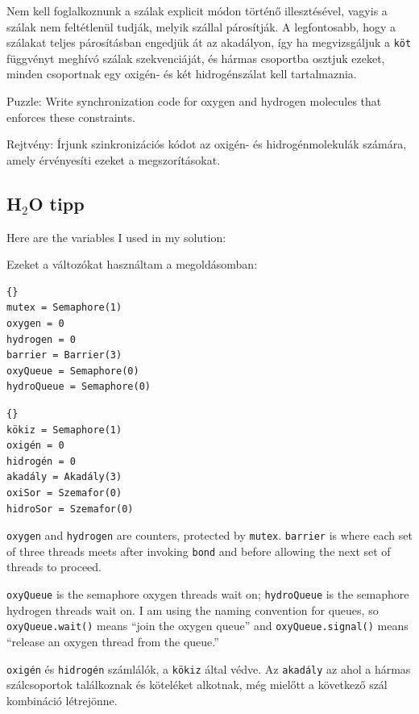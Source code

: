 \documentclass{book}
\newcommand{\clearemptydoublepage}{\newpage\cleardoublepage}
\begin{document}
Nem kell foglalkoznunk a szálak explicit módon történő illesztésével,
vagyis a szálak nem feltétlenül tudják, melyik szállal párosítják.
A legfontosabb, hogy a szálakat teljes párosításban engedjük át
az akadályon, így ha megvizsgáljuk a {\tt köt} függvényt meghívó szálak szekvenciáját,
és hármas csoportba osztjuk ezeket, minden csoportnak
egy oxigén- és két hidrogénszálat kell tartalmaznia. 

Puzzle: Write synchronization code for oxygen and hydrogen
molecules that enforces these constraints.

Rejtvény: Írjunk szinkronizációs kódot az oxigén- és hidrogénmolekulák
számára, amely érvényesíti ezeket a megszorításokat.

\clearemptydoublepage
\subsection{H$_2$O tipp}

Here are the variables I used in my solution:

Ezeket a változókat használtam a megoldásomban:

\begin{lstlisting}[title={Water building hint}]{}
mutex = Semaphore(1)
oxygen = 0
hydrogen = 0
barrier = Barrier(3)
oxyQueue = Semaphore(0)
hydroQueue = Semaphore(0)
\end{lstlisting}

\begin{lstlisting}[title={Vízgyártás tipp}]{}
kökiz = Semaphore(1)
oxigén = 0
hidrogén = 0
akadály = Akadály(3)
oxiSor = Szemafor(0)
hidroSor = Szemafor(0)
\end{lstlisting}

{\tt oxygen} and {\tt hydrogen} are counters, protected by {\tt mutex}.
{\tt barrier} is where each set of three threads meets after
invoking {\tt bond} and before allowing the next set of threads
to proceed.

{\tt oxyQueue} is the semaphore oxygen threads wait on;
{\tt hydroQueue} is the semaphore hydrogen threads wait on.
I am using the naming convention for queues, so
{\tt oxyQueue.wait()} means ``join the oxygen queue'' and
{\tt oxyQueue.signal()} means ``release an oxygen thread from
the queue.''

{\tt oxigén} és {\tt hidrogén} számlálók, a {\tt kökiz} által védve.
Az {\tt akadály} az ahol a hármas szálcsoportok találkoznak és köteléket
alkotnak, még mielőtt a következő szál kombináció létrejönne.
\end{document}
